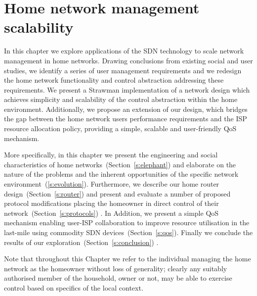 \chapter{Home network management scalability} \label{sec:homework} 

\ifpdf
\graphicspath{{Chapter2/Chapter2Figs/PNG/}{Chapter2/Chapter2Figs/PDF/}{Chapter2/Chapter2Figs/}}
\else 
\graphicspath{{Chapter2/Chapter2Figs/EPS/}{Chapter2/Chapter2Figs/}} 
\fi

In this chapter we explore applications of the SDN technology to scale network
management in home networks. Drawing conclusions from existing social and user
studies, we identify a series of user management requirements and we  
redesign the home network functionality and control abstraction addressing these
requirements. We present a Strawman implementation of a network design which
achieves simplicity and scalability of the control abstraction within the home
environment. Additionally, we propose an extension of our design, which bridges
the gap between the home network users performance requirements and the ISP
resource allocation policy, providing a simple, scalable and user-friendly QoS
mechanism.

More specifically, in this chapter we present the engineering and social
characteristics of home networks~(Section~\ref{s:elephant}) and elaborate on the
nature of the problems and the inherent opportunities of the specific network
environment~(\ref{s:evolution}).  Furthermore, we describe our home router
design~(Section~\ref{s:router}) and present and evaluate a number of proposed
protocol modifications placing the homeowner in direct control of their
network~(Section~\ref{s:protocols}) . In Addition, we present a simple QoS
mechanism enabling user-ISP collaboration to improve resource utilisation in the
last-mile using commodity SDN devices~(Section~\ref{s:qos}). Finally 
we conclude the results of our exploration~(Section~\ref{s:conclusion}) .

Note that throughout this Chapter we refer to the individual managing the home
network as the homeowner without loss of generality; clearly any suitably
authorised member of the household, owner or not, may be able to exercise control
based on specifics of the local context. 


